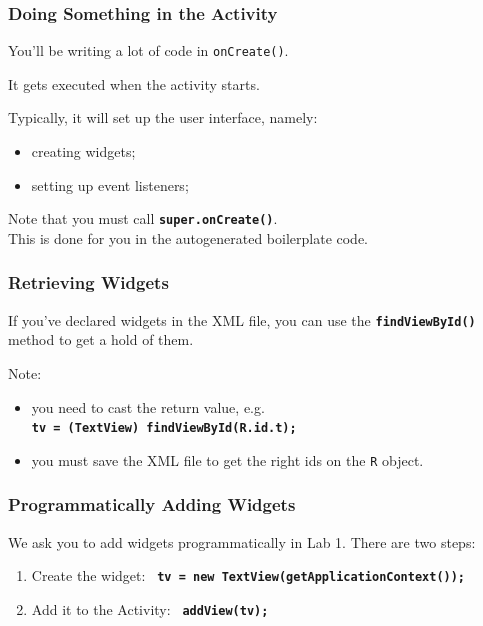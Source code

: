 \begin{frame}
\frametitle{Doing Something in the Activity}
\begin{changemargin}{1cm}

You'll be writing a lot of code in \texttt{onCreate()}. 

It gets executed when the activity 
starts. 

Typically, it will set up the user interface, namely:
\begin{itemize}
\item creating widgets;
\item setting up event listeners;
\end{itemize}

Note that you must call {\texttt{\textbf{super.onCreate()}}}. \\
\quad This is done for you in the autogenerated boilerplate code.


\end{changemargin}
\end{frame}

\begin{frame}
\frametitle{Retrieving Widgets}
\begin{changemargin}{1cm}

If you've declared widgets in the
XML file, you can use the {\texttt{\textbf{findViewById()}}} method
to get a hold of them. 

Note:
\begin{itemize}
\item you need to cast the return value, e.g. \\
\texttt{\textbf{tv = (TextView) findViewById(R.id.t);}}
\item you must save the XML file to get the right ids on the {\tt R} object.
\end{itemize}

\end{changemargin}
\end{frame}

\begin{frame}
\frametitle{Programmatically Adding Widgets}
\begin{changemargin}{1cm}

We ask you to
add widgets programmatically in Lab 1. There are two steps:
\begin{enumerate}
\item Create the widget: 
\texttt{\textbf{~tv = new TextView(getApplicationContext());}} 
\item Add it to the Activity:
\texttt{\textbf{~addView(tv);}}
\end{enumerate}
\end{changemargin}
\end{frame}

